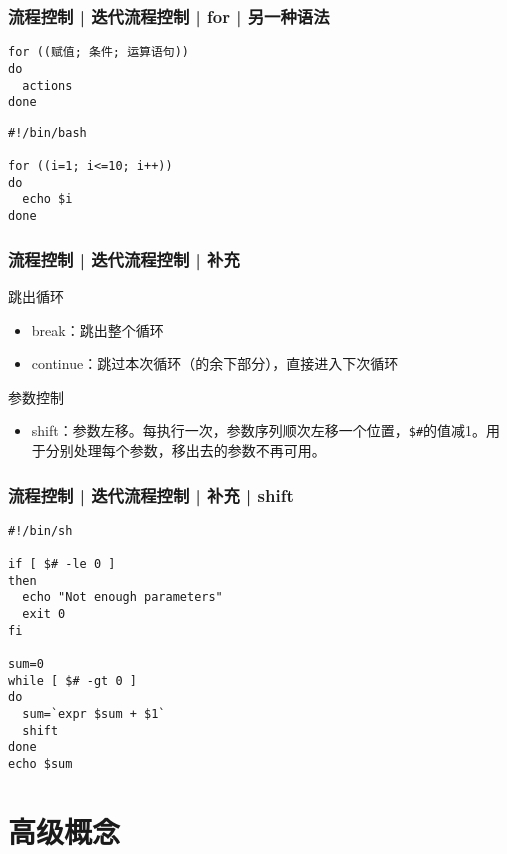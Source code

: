 \begin{frame}[fragile]
  \frametitle{流程控制 | 迭代流程控制 | for | \alert{另一种语法}}
\begin{lstlisting}
for ((赋值; 条件; 运算语句))
do
  actions
done
\end{lstlisting}
\pause
\begin{lstlisting}
#!/bin/bash

for ((i=1; i<=10; i++))
do
  echo $i
done 
\end{lstlisting}
\end{frame}

\begin{frame}[fragile]
  \frametitle{流程控制 | 迭代流程控制 | \alert{补充}}
  \begin{block}{跳出循环}
    \begin{itemize}
      \item break：跳出整个循环
      \item continue：跳过本次循环（的余下部分），直接进入下次循环
    \end{itemize}
  \end{block}
  \pause
  \begin{block}{参数控制}
    \begin{itemize}
      \item
	shift：参数左移。每执行一次，参数序列顺次左移一个位置，\verb|$#|的值减1。用于分别处理每个参数，移出去的参数不再可用。
    \end{itemize}
  \end{block}
\end{frame}

\begin{frame}[fragile]
  \frametitle{流程控制 | 迭代流程控制 | 补充 | shift}
\begin{lstlisting}
#!/bin/sh

if [ $# -le 0 ]
then
  echo "Not enough parameters"
  exit 0
fi

sum=0
while [ $# -gt 0 ]
do
  sum=`expr $sum + $1`
  shift
done
echo $sum
\end{lstlisting}
\end{frame}

\section{高级概念}
